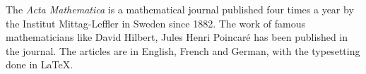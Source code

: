 \documentclass[12pt]{article}
\begin{document}
The {\it Acta Mathematica} is a mathematical journal published four times a year by the Institut Mittag-Leffler in Sweden since 1882. The work of famous mathematicians like David Hilbert, Jules Henri Poincar\'e has been published in the journal. The articles are in English, French and German, with the typesetting done in LaTeX.
\end{document}
